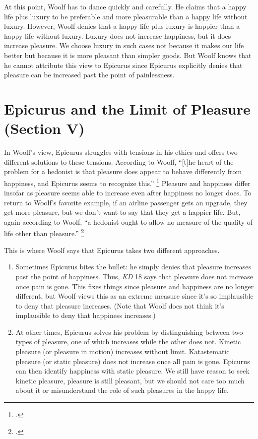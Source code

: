 \documentclass[12pt,letterpaper]{article}
\begin{document}
At this point, Woolf has to dance quickly and carefully.
He claims that a happy life plus luxury to be preferable and more pleasurable than a happy life without luxury.
However, Woolf denies that a happy life plus luxury is happier than a happy life without luxury.
Luxury does not increase happiness, but it does increase pleasure.
We choose luxury in such cases not because it makes our life better but because it is more pleasant than simpler goods.
But Woolf knows that he cannot attribute this view to Epicurus since Epicurus explicitly denies that pleasure can be increased past the point of painlessness.

\section*{Epicurus and the Limit of Pleasure (Section V)}

In Woolf's view, Epicurus struggles with tensions in his ethics and offers two different solutions to these tensions.
According to Woolf, ``[t]he heart of the problem for a hedonist is that pleasure does appear to behave differently from happiness, and Epicurus seems to recognize this.''%
\footcite[][168]{hellenistic-philosophy-brunschwig-sedley-2003}
Pleasure and happiness differ insofar as pleasure seems able to increase even after happiness no longer does.
To return to Woolf's favorite example, if an airline passenger gets an upgrade, they get more pleasure, but we don't want to say that they get a happier life.
But, again according to Woolf, ``a hedonist ought to allow no measure of the quality of life other than pleasure.''%
\footcite[][168]{hellenistic-philosophy-brunschwig-sedley-2003}

This is where Woolf says that Epicurus takes two different approaches.

\begin{enumerate}
    \item Sometimes Epicurus bites the bullet: he simply denies that pleasure increases past the point of happiness.
    Thus, \textit{KD} 18 says that pleasure does not increase once pain is gone.
    This fixes things since pleasure and happiness are no longer different, but Woolf views this as an extreme measure since it's so implausible to deny that pleasure increases.
    (Note that Woolf does not think it's implausible to deny that happiness increases.)
    \item At other times, Epicurus solves his problem by distinguishing between two types of pleasure, one of which increases while the other does not.
    Kinetic pleasure (or pleasure in motion) increases without limit.
    Katastematic pleasure (or static pleasure) does not increase once all pain is gone.
    Epicurus can then identify happiness with static pleasure.
    We still have reason to seek kinetic pleasure, pleasure is still pleasant, but we should not care too much about it or misunderstand the role of such pleasures in the happy life.
\end{enumerate}
\end{document}
